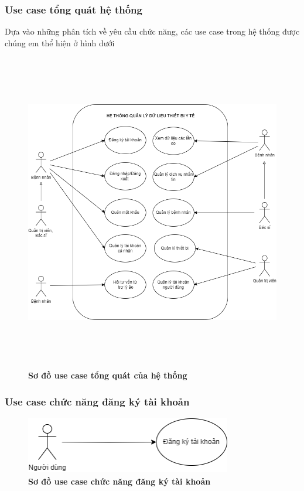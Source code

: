 \subsubsection{Use case tổng quát hệ thống}
Dựa vào những phân tích về yêu cầu chức năng, các use case trong hệ thống được chúng em thể hiện ở hình dưới 
  \begin{figure}[H]
    \centering
    \includegraphics[width=16cm,height=14cm]{Images/use_case/use_case_general.png}
    \caption[Sơ đồ use case tổng quát của hệ thống]{\bfseries \fontsize{12pt}{0pt}
    \selectfont Sơ đồ use case tổng quát của hệ thống}
    \label{use_case_general} %
  \end{figure}

\subsubsection{Use case chức năng đăng ký tài khoản}
  \begin{figure}[H]
    \centering
    \includegraphics[width=9cm,height=2.5cm]{Images/use_case/use_case_register.png}
    \caption[Sơ đồ use case chức năng đăng ký tài khoản]{\bfseries \fontsize{12pt}{0pt}
    \selectfont Sơ đồ use case chức năng đăng ký tài khoản}
    \label{use_case_register} %
  \end{figure}

